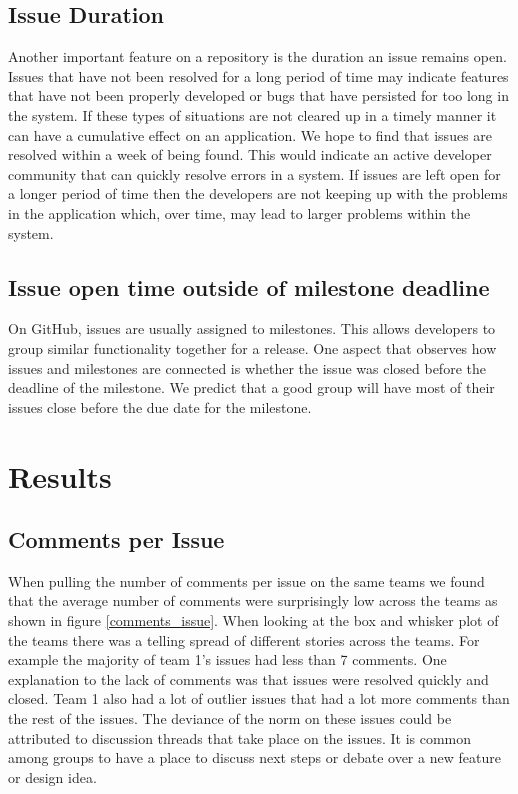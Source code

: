 \documentclass[conference]{IEEEtran}
\begin{document}
\subsection{Issue Duration}
Another important feature on a repository is the duration an issue remains open. Issues that have not been resolved for a long period of time may indicate features that have not been properly developed or bugs that have persisted for too long in the system. If these types of situations are not cleared up in a timely manner it can have a cumulative effect on an application. We hope to find that issues are resolved within a week of being found. This would indicate an active developer community that can quickly resolve errors in a system. If issues are left open for a longer period of time then the developers are not keeping up with the problems in the application which, over time, may lead to larger problems within the system. 

\subsection{Issue open time outside of milestone deadline}
On GitHub, issues are usually assigned to milestones. This allows developers to group similar functionality together for a release. One aspect that observes how issues and milestones are connected is whether the issue was closed before the deadline of the milestone. We predict that a good group will have most of their issues close before the due date for the milestone. 





\section{Results}
\subsection{Comments per Issue}
When pulling the number of comments per issue on the same teams we found that the average number of comments were surprisingly low across the teams as shown in figure \ref{comments_issue}. When looking at the box and whisker plot of the teams there was a telling spread of different stories across the teams. For example the majority of team 1's issues had less than 7 comments. One explanation to the lack of comments was that issues were resolved quickly and closed. Team 1 also had a lot of outlier issues that had a lot more comments than the rest of the issues. The deviance of the norm on these issues could be attributed to discussion threads that take place on the issues. It is common among groups to have a place to discuss next steps or debate over a new feature or design idea.
\end{document}
